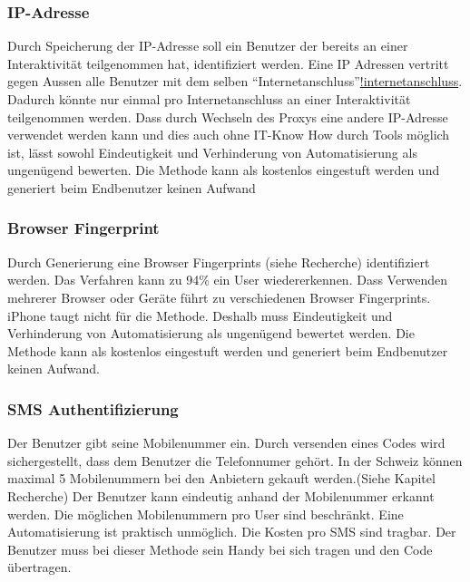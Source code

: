 \subsubsection{IP-Adresse}\label{ip-adresse-1}

Durch Speicherung der IP-Adresse soll ein Benutzer der bereits an einer
Interaktivität teilgenommen hat, identifiziert werden. Eine IP Adressen
vertritt gegen Aussen alle Benutzer mit dem selben
``Internetanschluss''\href{Der\%20Begriff\%20Internetanschluss\%20ist\%20schwamig\%20eingesetzt.}{!internetanschluss}.
Dadurch könnte nur einmal pro Internetanschluss an einer Interaktivität
teilgenommen werden. Dass durch Wechseln des Proxys eine andere
IP-Adresse verwendet werden kann und dies auch ohne IT-Know How durch
Tools möglich ist, lässt sowohl Eindeutigkeit und Verhinderung von
Automatisierung als ungenügend bewerten. Die Methode kann als kostenlos
eingestuft werden und generiert beim Endbenutzer keinen Aufwand

\subsubsection{Browser Fingerprint}\label{browser-fingerprint}

Durch Generierung eine Browser Fingerprints (siehe Recherche)
identifiziert werden. Das Verfahren kann zu 94\% ein User
wiedererkennen. Dass Verwenden mehrerer Browser oder Geräte führt zu
verschiedenen Browser Fingerprints. iPhone taugt nicht für die Methode.
Deshalb muss Eindeutigkeit und Verhinderung von Automatisierung als
ungenügend bewertet werden. Die Methode kann als kostenlos eingestuft
werden und generiert beim Endbenutzer keinen Aufwand.

\subsubsection{SMS Authentifizierung}\label{sms-authentifizierung}

Der Benutzer gibt seine Mobilenummer ein. Durch versenden eines Codes
wird sichergestellt, dass dem Benutzer die Telefonnumer gehört. In der
Schweiz können maximal 5 Mobilenummern bei den Anbietern gekauft
werden.(Siehe Kapitel Recherche) Der Benutzer kann eindeutig anhand der
Mobilenummer erkannt werden. Die möglichen Mobilenummern pro User sind
beschränkt. Eine Automatisierung ist praktisch unmöglich. Die Kosten pro
SMS sind tragbar. Der Benutzer muss bei dieser Methode sein Handy bei
sich tragen und den Code übertragen.

